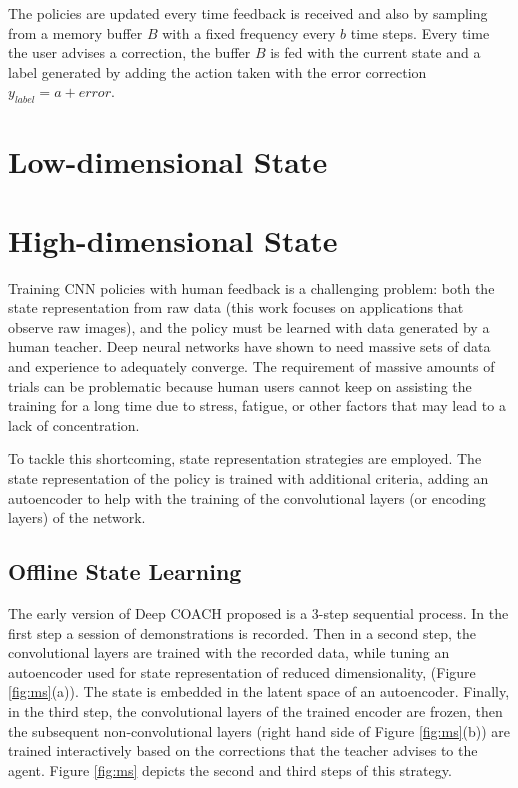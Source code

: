 The policies are updated every time feedback is received and also by sampling from a memory buffer $B$ with a fixed frequency every $b$ time steps. Every time the user advises a correction, the buffer $B$ is fed with the current state and a label generated by adding the action taken with the error correction $y_{label}=a+\mathit{error}$.

\section{Low-dimensional State}

\section{High-dimensional State}
Training CNN policies with human feedback is a challenging problem: both the state representation from raw data (this work focuses on applications that observe raw images), and the policy must be learned with data generated by a human teacher. Deep neural networks have shown to need massive sets of data and experience to adequately converge.  The requirement of massive amounts of trials can be problematic because human users cannot keep on assisting the training for a long time due to stress, fatigue, or other factors that may lead to a lack of concentration.  

To tackle this shortcoming, state representation strategies are employed. The state representation of the policy is trained with additional criteria, adding an autoencoder to help with the training of the convolutional layers (or encoding layers) of the network. 

\subsection{Offline State Learning}
The early version of Deep COACH proposed is a 3-step sequential process. In the first step a session of demonstrations is recorded. Then in a second step, the convolutional layers are trained  with the recorded data, while tuning an  autoencoder  used  for state representation of reduced dimensionality, (Figure \ref{fig:ms}(a)). The state is embedded in the latent space of an autoencoder. Finally, in the third step, the convolutional layers of the trained encoder are frozen, then the subsequent non-convolutional layers (right hand side of Figure \ref{fig:ms}(b)) are trained interactively based on the corrections that the teacher advises to the agent. Figure \ref{fig:ms} depicts the second and third steps of this strategy. 

